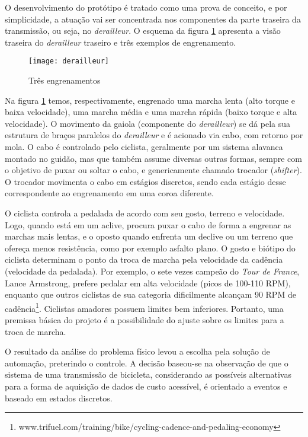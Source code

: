 \documentclass[a4paper,11pt]{article}
\begin{document}
O desenvolvimento do protótipo é tratado como uma prova de conceito, e por
simplicidade, a atuação vai ser concentrada nos componentes da parte traseira
da transmissão, ou seja, no \textit{derailleur}.
O esquema da figura \ref{fig:derailleur} apresenta a visão traseira
do \textit{derailleur} traseiro e três exemplos de engrenamento.
\begin{figure}[ht]
\begin{center}
 \texttt{[image: derailleur]}
\end{center}
  \caption{Três engrenamentos}
  \label{fig:derailleur}
\end{figure}
Na figura \ref{fig:derailleur} temos, respectivamente, engrenado uma marcha
lenta (alto torque e baixa velocidade), uma marcha média e uma marcha rápida
(baixo torque e alta velocidade). O movimento da gaiola (componente do
\textit{derailleur}) se dá pela sua estrutura de braços paralelos do
\textit{derailleur} e é acionado via cabo, com retorno por mola. O cabo é
controlado pelo ciclista, geralmente por um sistema alavanca montado no guidão,
mas que também assume diversas outras formas, sempre com o objetivo de puxar ou
soltar o cabo, e genericamente chamado trocador (\textit{shifter}). O
trocador movimenta o cabo em estágios discretos, sendo cada estágio desse
correspondente ao engrenamento em uma coroa diferente.

O ciclista controla a pedalada de acordo com seu gosto, terreno e
velocidade. Logo, quando está em um aclive, procura puxar o cabo de forma a
engrenar as marchas mais lentas, e o oposto quando enfrenta um declive ou um
terreno que ofereça menos resistência, como por exemplo asfalto plano. O gosto e
biótipo do ciclista determinam o ponto da troca de marcha pela velocidade da
cadência (velocidade da pedalada). Por exemplo, o sete vezes campeão do
\textit{Tour de France}, Lance Armstrong, prefere pedalar em alta velocidade
(picos de 100-110 RPM), enquanto que outros ciclistas de sua categoria
dificilmente alcançam 90 RPM de
cadência\footnote{
www.trifuel.com/training/bike/cycling-cadence-and-pedaling-economy}.
Ciclistas amadores possuem limites bem inferiores. Portanto, uma premissa básica
do projeto é a possibilidade do ajuste sobre os limites para a troca de marcha.

O resultado da análise do problema físico levou a escolha pela solução de
automação, preterindo o controle. A decisão baseou-se na observação de que o
sistema de uma transmissão de bicicleta, considerando as possíveis alternativas
para a forma de aquisição de dados de custo acessível, é orientado a
eventos e baseado em estados discretos.
\end{document}
